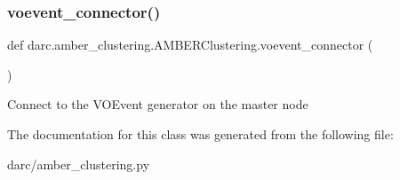\subsubsection{\texorpdfstring{voevent\_connector()}{voevent\_connector()}}
{\footnotesize\ttfamily def darc.\+amber\+\_\+clustering.\+A\+M\+B\+E\+R\+Clustering.\+voevent\+\_\+connector (\begin{DoxyParamCaption}{ }\end{DoxyParamCaption})\hspace{0.3cm}{\ttfamily [static]}}

\begin{DoxyVerb}Connect to the VOEvent generator on the master node
\end{DoxyVerb}
 

The documentation for this class was generated from the following file\+:\begin{DoxyCompactItemize}
\item 
darc/amber\+\_\+clustering.\+py\end{DoxyCompactItemize}
